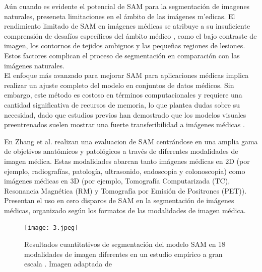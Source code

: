 \documentclass[12pt]{article}
\begin{document}
		A\'un cuando es evidente el potencial de SAM para la segmentaci\'on de imagenes naturales, preseneta limitaciones en el \'ambito de las im\'agenes m'edicas. El rendimiento limitado de SAM en imágenes médicas se atribuye a su insuficiente comprensión de desafíos específicos del ámbito médico \parencite{Ma2023}, como el bajo contraste de imagen, los contornos de tejidos ambiguos y las pequeñas regiones de lesiones. Estos factores complican el proceso de segmentación en comparación con las imágenes naturales.
		\\
		El enfoque más avanzado para mejorar SAM para aplicaciones médicas implica realizar un ajuste completo del modelo en conjuntos de datos médicos. Sin embargo, este método es costoso en términos computacionales y requiere una cantidad significativa de recursos de memoria, lo que plantea dudas sobre su necesidad, dado que estudios previos han demostrado que los modelos visuales preentrenados suelen mostrar una fuerte transferibilidad a imágenes médicas \parencite{Raghu2019}. 
		
		En Zhang et al. \cite{Zhang2024SegmentAnything} realizan una evaluacion de SAM centrándose en una amplia gama de objetivos anatómicos y patológicos a través de diferentes modalidades de imagen médica. Estas modalidades abarcan tanto imágenes médicas en 2D (por ejemplo, radiografías, patología, ultrasonido, endoscopia y colonoscopia) como imágenes médicas en 3D (por ejemplo, Tomografía Computarizada (TC), Resonancia Magnética (RM) y Tomografía por Emisión de Positrones (PET)). Presentan el uso en cero disparos de SAM en la segmentación de imágenes médicas, organizado según los formatos de las modalidades de imagen médica.
		
		\begin{figure}[h] 
			\centering
			\caption{ Resultados cuantitativos de segmentación del modelo SAM en 18 modalidades de imagen diferentes en un estudio empírico a gran escala \cite{Huang2024}. Imagen adaptada de \cite{Zhang2024SegmentAnything}}
			\texttt{[image: 3.jpeg]}
			
			\label{fig:fig2}
			
			
		\end{figure}
		
		
		
\end{document}

